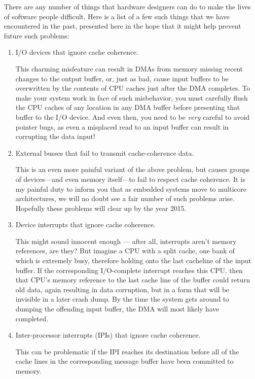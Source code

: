 There are any number of things that hardware designers can do
to make the lives of software people difficult.
Here is a list of a few such things that we have encountered in
the past, presented here in the hope that it might help prevent
future such problems:
\begin{enumerate}
\item	I/O devices that ignore cache coherence.

	This charming misfeature can result in DMAs from memory
	missing recent changes to the output buffer, or, just as
	bad, cause input buffers to be overwritten by the contents
	of CPU caches just after the DMA completes.
	To make your system work in face of such misbehavior,
	you must carefully flush the CPU caches of any location
	in any DMA buffer before presenting that buffer to the
	I/O device.
	And even then, you need to be \emph{very} careful to avoid
	pointer bugs, as even a misplaced read to an input buffer
	can result in corrupting the data input!

\item	External busses that fail to transmit cache-coherence data.
	
	This is an even more painful variant of the above problem,
	but causes groups of devices---and even memory itself---to
	fail to respect cache coherence.
	It is my painful duty to inform you that as embedded systems
	move to multicore architectures, we will no doubt see a fair
	number of such problems arise.
	Hopefully these problems will clear up by the year 2015.

\item	Device interrupts that ignore cache coherence.

	This might sound innocent enough --- after all, interrupts
	aren't memory references, are they?
	But imagine a CPU with a split cache, one bank of which is
	extremely busy, therefore holding onto the last cacheline
	of the input buffer.
	If the corresponding I/O-complete interrupt reaches this
	CPU, then that CPU's memory reference to the last cache
	line of the buffer could return old data, again resulting
	in data corruption, but in a form that will be invisible
	in a later crash dump.
	By the time the system gets around to dumping the offending
	input buffer, the DMA will most likely have completed.

\item	Inter-processor interrupts (IPIs) that ignore cache coherence.

	This can be problematic if the IPI reaches its destination
	before all of the cache lines in the corresponding message
	buffer have been committed to memory.


\end{enumerate}
